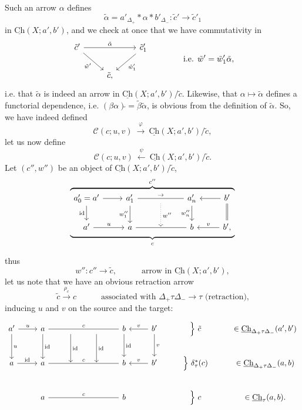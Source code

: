 \documentclass[11pt]{article}
\newcommand{\printedpage}[1]{\marginpar{\footnotesize p.~#1}}
\newcommand{\msp}[1]{\marginpar{\footnotesize [#1]}}
\newcommand{\Ch}{\underline{\mathrm{Ch}}}
\newcommand{\cC}{\mathcal{C}}
\begin{document}
Such an arrow $\alpha$ defines
\[
\tilde{\alpha} = a'_{\Delta_{+}} \ast \alpha \ast b'_{\Delta_{-}} : \tilde{c}' \longrightarrow \tilde{c}'_1
\]
in $\Ch(X;a',b')$, and we check
\msp{page 164}
at once that we have commutativity in
\[
\begin{tikzcd}
\tilde{c}' \ar[rr,"\tilde{\alpha}"] \ar[dr,"\tilde{w}'"'] & & \tilde{c}'_1 \ar[dl,"\tilde{w}'_1"] \\
& \tilde{c}, &
\end{tikzcd}
\qquad\qquad \text{i.e. } \tilde{w}' = \tilde{w}'_1\tilde{\alpha},
\]
i.e. that $\tilde{\alpha}$ is indeed an arrow in $\Ch(X;a',b')/\tilde{c}$. Likewise, that $\alpha \longmapsto \tilde{\alpha}$ defines a functorial dependence, i.e. $(\beta\alpha)\tilde{} = \tilde{\beta}\tilde{\alpha}$, is obvious from the definition of $\tilde{\alpha}$. So, we have indeed defined %
\[
\cC(c;u,v) \ \xrightarrow{\ \varphi\ }\ \Ch(X;a',b')/\tilde{c},
\]
let us now define
\[
\cC(c;u,v) \ \xleftarrow{\ \psi\ }\ \Ch(X;a',b')/\tilde{c}.
\]
Let $(c'',w'')$ be an object of $\Ch(X;a',b')/\tilde{c}$,
\[
\overbrace{\underbrace{\begin{tikzcd}[ampersand replacement=\&]
a'_0 = a' \ar[r] \ar[d,"\mathrm{id}"'] \& a'_1 \ar[rr,no head,"\rightarrow"] \ar[d,"w''_1"'] \& {} \ar[d,dotted,"w''"] \& a'_n \ar[d,"w''_n"'] \& b' \ar[l] \ar[d,equal] \\
a' \ar[r,"u"] \& a \ar[rr,no head] \& {} \& b \& b', \ar[l,"v"']
\end{tikzcd}}_{c}}^{c''}
\]

\printedpage{103}
thus
\[
w'' : c'' \longrightarrow \tilde{c}, \qquad\quad \text{arrow in } \Ch(X;a',b'),
\]
let us note that we have an obvious retraction arrow
\[
\tilde{c} \xrightarrow{\rho_c} c \qquad\quad \text{associated with } \Delta_{+}\tau\Delta_{-} \longrightarrow \tau \text{ (retraction),}
\]
inducing $u$ and $v$ on the source and the target:
\[
\begin{tikzcd}
a' \ar[r,"u"] \ar[d,"u"] & a \ar[rrr,no head,"c"] \ar[d,"\mathrm{id}"] & {} \ar[d,"\mathrm{id}"] & {} \ar[d,"\mathrm{id}"] & b \ar[d,"\mathrm{id}"] & b' \ar[l,"v"'] \ar[d,"v"] & \Big\}\ \tilde{c} & \in \Ch_{\Delta_{+}\tau\Delta_{-}}(a',b') \\
a \ar[r,"\mathrm{id}"] & a \ar[rrr,no head,"c"] & {} & {} & b & b' \ar[l,"v"'] & \Big\}\ \delta^{*}_{\tau}(c) & \in \Ch_{\Delta_{+}\tau\Delta_{-}}(a,b) \\
& a \ar[rrr,no head,"c"] & & & b & & \Big\}\ c & \in \Ch_{\tau}(a,b).
\end{tikzcd}
\]
\end{document}
